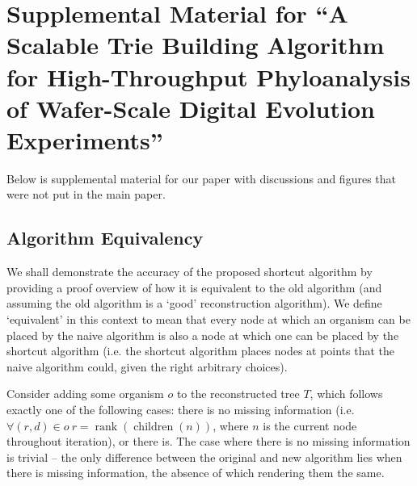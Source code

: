 \appendix
\section*{\Huge Supplemental Material for ``A Scalable Trie Building Algorithm for High-Throughput Phyloanalysis of Wafer-Scale Digital Evolution Experiments''}

\setcounter{section}{0}

\makeatletter
\def\@seccntformat#1{\@ifundefined{#1@cntformat}%
   {\csname the#1\endcsname\space}%
   {\csname #1@cntformat\endcsname}}%
\newcommand\section@cntformat{\thesection.\space} %
\makeatother
\renewcommand{\thesection}{S\arabic{section}}

\vspace{0.8em}

Below is supplemental material for our paper \citep{supplemental} with discussions and figures that were not put in the main paper.

\subsection{Algorithm Equivalency}

\label{sec:algorithm:equivalency}

We shall demonstrate the accuracy of the proposed shortcut algorithm by providing a proof overview of how it is equivalent to the old algorithm (and assuming the old algorithm is a `good' reconstruction algorithm).
We define `equivalent' in this context to mean that every node at which an organism can be placed by the naive algorithm is also a node at which one can be placed by the shortcut algorithm (i.e. the shortcut algorithm places nodes at points that the naive algorithm could, given the right arbitrary choices).

Consider adding some organism $o$ to the reconstructed tree $T$, which follows exactly one of the following cases: there is no missing information (i.e. $\forall (r, d) \in o\ r = \operatorname{rank}(\operatorname{children}(n))$, where $n$ is the current node throughout iteration), or there is.
The case where there is no missing information is trivial -- the only difference between the original and new algorithm lies when there is missing information, the absence of which rendering them the same.

